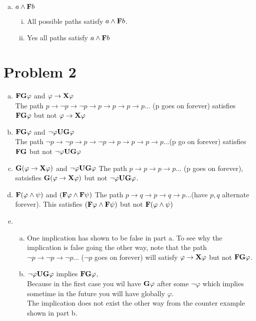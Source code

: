 \documentclass[11pt,leqno,fleqn]{article}
\begin{document}
\begin{enumerate}[(a)]
\item $a \land  \bold{F} b$
 \begin{enumerate}[(i)]
 \item All possible paths satisfy $a \land  \bold{F} b$.
 \item Yes all paths satisfy  $a \land  \bold{F} b$
 \end{enumerate}
 
\end{enumerate}

\section{Problem 2}
 \begin{enumerate}[(a)]
\item $\bold{FG} \varphi$ and $\bold{\varphi \to \bold{X} \varphi}$\\
The path $p \to \neg p \to \neg p \to p \to p \to p \to p ...$ (p goes on forever) satisfies $\bold{FG} \varphi$ but not  $\bold{\varphi \to \bold{X} \varphi}$

\item  $\bold{FG} \varphi$ and $\neg \varphi \bold{UG} \varphi $\\
The path $\neg p \to \neg p \to p \to \neg p \to p \to p \to p \to p...$(p go on forever) satisfies $\bold{FG}$ but not $\neg \varphi \bold{UG} \varphi $ 

\item $ \bold{G}(\varphi \to \bold{X} \varphi)$ and $\neg \varphi \bold{UG} \varphi $
The path $p \to p \to p \to p$... (p goes on forever), satsisfies $ \bold{G}(\varphi \to \bold{X} \varphi)$  but not $\neg \varphi \bold{UG} \varphi $.\\

\item $\bold{F}(\varphi \land \psi)$ and $( \bold{F} \varphi \land \bold{F} \psi)$
The path $ p \to q \to p \to q \to p...$(have $ p, q$ alternate forever). This satisfies  $( \bold{F} \varphi \land \bold{F} \psi)$ but not  $\bold{F}(\varphi \land \psi)$

\item  
\begin{enumerate}[(a)]
\item One implication has shown to be false in part a. To see why the implication is false going the other way, note that the path $\neg p \to \neg p \to \neg p ...$ ($\neg p$ goes on forever) will satisfy  $\bold{\varphi \to \bold{X} \varphi}$ but not $\bold{FG} \varphi$.
\item $\neg \varphi \bold{UG} \varphi $ implies $\bold{FG} \varphi$,
\\ Because in the first case you wil have $\bold{G} \varphi$ after some $\neg \varphi$ which implies sometime in the future you will have globally $\varphi$.
\\ The implication does not exist the other way from the counter example shown in part b.


\end{enumerate}
\end{enumerate}
\end{document}
